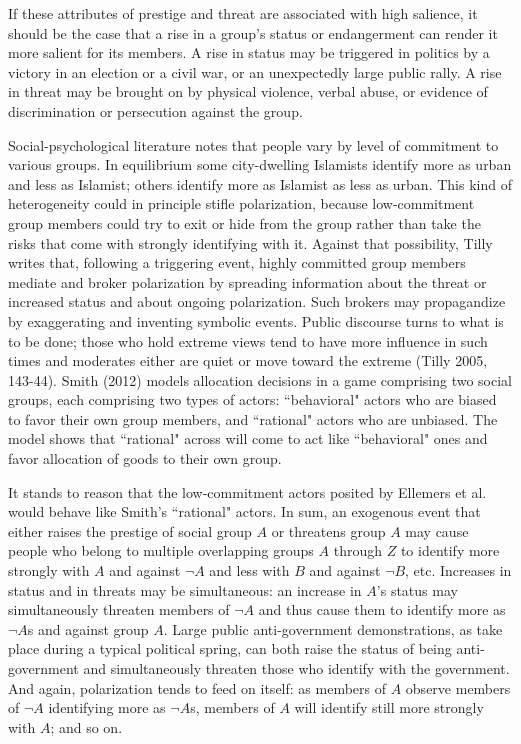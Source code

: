 \documentclass[12pt]{article}
\begin{document}
If these attributes of prestige and threat are associated with high salience, it should be the case that a rise in a group's status or endangerment can render it more salient for its members.  A rise in status may be triggered in politics by a victory in an election or a civil war, or an unexpectedly large public rally.  A rise in threat may be brought on by physical violence, verbal abuse, or evidence of discrimination or persecution against the group.

Social-psychological literature notes that people vary by level of commitment to various groups.   In equilibrium some city-dwelling Islamists identify more as urban and less as Islamist; others identify more as Islamist as less as urban.  This kind of heterogeneity could in principle stifle polarization, because low-commitment group members could try to exit or hide from the group rather than take the risks that come with strongly identifying with it.  Against that possibility, Tilly writes that, following a triggering event, highly committed group members mediate and broker polarization by spreading information about the threat or increased status and about ongoing polarization.   Such brokers may propagandize by exaggerating and inventing symbolic events.  Public discourse turns to what is to be done; those who hold extreme views tend to have more influence in such times and moderates either are quiet or move toward the extreme (Tilly 2005, 143-44).   Smith (2012) models allocation decisions in a game comprising two social groups, each comprising two types of actors:  ``behavioral" actors who are biased to favor their own group members, and ``rational" actors who are unbiased.  The model shows that ``rational" across will come to act like ``behavioral" ones and favor allocation of goods to their own group.  

It stands to reason that the low-commitment actors posited by Ellemers et al. would behave like Smith's ``rational" actors.
In sum, an exogenous event that either raises the prestige of social group $A$ or threatens group $A$ may cause people who belong to multiple overlapping groups $A$ through $Z$ to identify more strongly with $A$ and against $\neg A$ and less with $B$ and against $\neg B$, etc.  Increases in status and in threats may be simultaneous:  an increase in $A$'s status may simultaneously threaten members of $\neg A$ and thus cause them to identify more as $\neg A$s and against group $A$.  Large public anti-government demonstrations, as take place during a typical political spring, can both raise the status of being anti-government and simultaneously threaten those who identify with the government.  And again, polarization tends to feed on itself:  as members of $A$ observe members of $\neg A$ identifying more as $\neg A$s, members of $A$ will identify still more strongly with $A$; and so on. 
\end{document}
